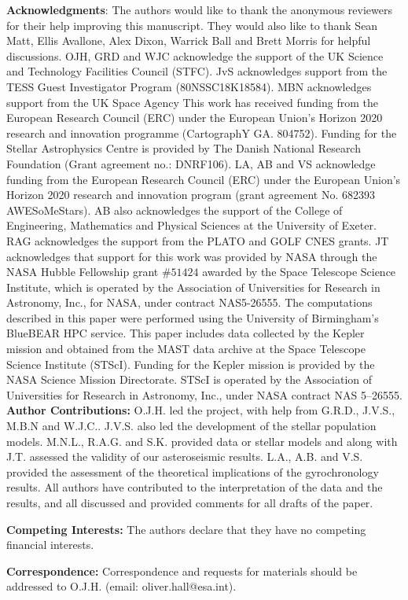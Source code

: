 \documentclass[12pt]{article}
\begin{document}
\newpage
\textbf{Acknowledgments}: The authors would like to thank the anonymous reviewers for their help improving this manuscript. They would also like to thank Sean Matt, Ellis Avallone, Alex Dixon, Warrick Ball and Brett Morris for helpful discussions.
OJH, GRD and WJC acknowledge the support of the UK Science and Technology Facilities Council (STFC). 
JvS acknowledges support from the TESS Guest Investigator Program (80NSSC18K18584).
MBN acknowledges support from the UK Space Agency
This work has received funding from the European Research Council (ERC) under the European Union's Horizon 2020 research and innovation programme (CartographY GA. 804752).
Funding for the Stellar Astrophysics Centre is provided by The Danish National Research Foundation (Grant agreement no.: DNRF106). 
LA, AB and VS acknowledge funding from the European Research Council (ERC) under the European Union's Horizon 2020 research and innovation program (grant agreement No. 682393 AWESoMeStars). AB also acknowledges the support of the College of Engineering, Mathematics and Physical Sciences at the University of Exeter.
RAG acknowledges the support from the PLATO and GOLF CNES grants.
JT acknowledges that support for this work was provided by NASA through the NASA Hubble Fellowship grant $\#51424$ awarded by the Space Telescope Science Institute, which is operated by the Association of Universities for Research in Astronomy, Inc., for NASA, under contract NAS5-26555.
The computations described in this paper were performed using the University of Birmingham's BlueBEAR HPC service.
This paper includes data collected by the Kepler mission and obtained from the MAST data archive at the Space Telescope Science Institute (STScI). Funding for the Kepler mission is provided by the NASA Science Mission Directorate. STScI is operated by the Association of Universities for Research in Astronomy, Inc., under NASA contract NAS 5–26555.\\

\textbf{Author Contributions:} O.J.H. led the project, with help from G.R.D., J.V.S., M.B.N and W.J.C.. J.V.S. also led the development of the stellar population models. M.N.L., R.A.G. and S.K. provided data or stellar models and along with J.T. assessed the validity of our asteroseismic results. L.A., A.B. and V.S. provided the assessment of the theoretical implications of the gyrochronology results. All authors have contributed to the interpretation of the data and the results, and all discussed and provided comments for all drafts of the paper.

\textbf{Competing Interests:} The authors declare that they have no competing financial interests.

\textbf{Correspondence:} Correspondence and requests for materials should be addressed to O.J.H. (email: oliver.hall@esa.int).\\

\clearpage


\clearpage

\end{document}
